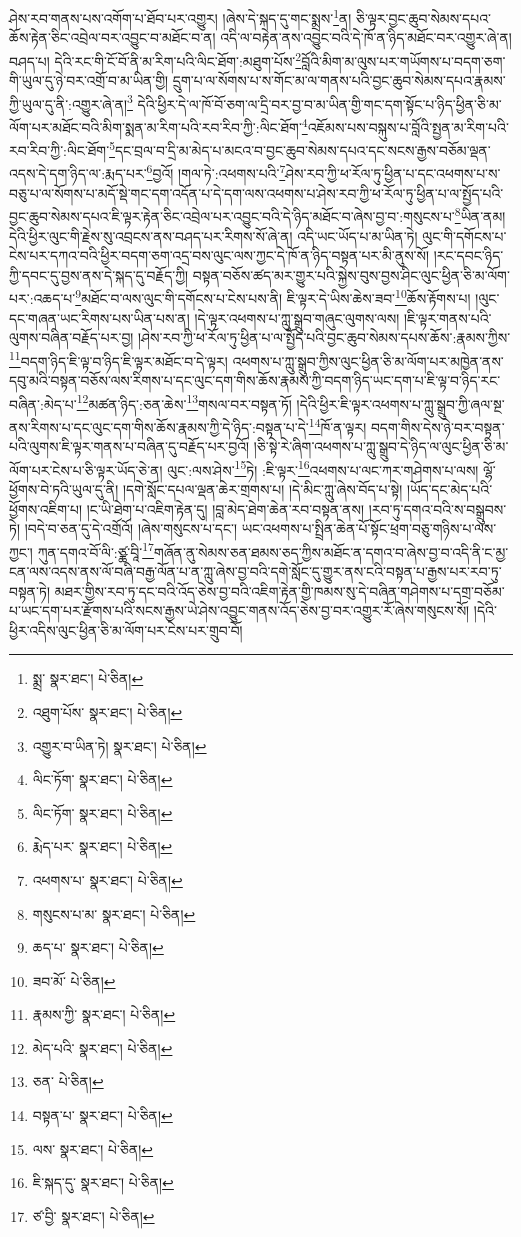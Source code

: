 ཤེས་རབ་གནས་པས་འགོག་པ་ཐོབ་པར་འགྱུར། །ཞེས་དེ་སྐད་དུ་གང་སྨྲས་\footnote{སྨྲ་  སྣར་ཐང་།  པེ་ཅིན། }ན། ཅི་ལྟར་བྱང་ཆུབ་སེམས་དཔའ་ཆོས་རྟེན་ཅིང་འབྲེལ་བར་འབྱུང་བ་མཐོང་བ་ན། འདི་ལ་བརྟེན་ནས་འབྱུང་བའི་དེ་ཁོ་ན་ཉིད་མཐོང་བར་འགྱུར་ཞེ་ན། བཤད་པ། དེའི་རང་གི་ངོ་བོ་ནི་མ་རིག་པའི་ལིང་ཐོག་:མཐུག་པོས་\footnote{འཐུག་པོས་  སྣར་ཐང་།  པེ་ཅིན། }བློའི་མིག་མ་ལུས་པར་གཡོགས་པ་བདག་ཅག་གི་ཡུལ་དུ་ཉེ་བར་འགྲོ་བ་མ་ཡིན་གྱི། དྲུག་པ་ལ་སོགས་པ་ས་གོང་མ་ལ་གནས་པའི་བྱང་ཆུབ་སེམས་དཔའ་རྣམས་ཀྱི་ཡུལ་དུ་ནི་:འགྱུར་ཞེ་ན།\footnote{འགྱུར་བ་ཡིན་ཏེ།  སྣར་ཐང་།  པེ་ཅིན། } དེའི་ཕྱིར་དེ་ལ་ཁོ་བོ་ཅག་ལ་དྲི་བར་བྱ་བ་མ་ཡིན་གྱི་གང་དག་སྟོང་པ་ཉིད་ཕྱིན་ཅི་མ་ལོག་པར་མཐོང་བའི་མིག་སྨན་མ་རིག་པའི་རབ་རིབ་ཀྱི་:ལིང་ཐོག་\footnote{ལིང་ཏོག་  སྣར་ཐང་།  པེ་ཅིན། }འཇོམས་པས་བསྐུས་པ་བློའི་སྤྱན་མ་རིག་པའི་རབ་རིབ་ཀྱི་:ལིང་ཐོག་\footnote{ལིང་ཏོག་  སྣར་ཐང་།  པེ་ཅིན། }དང་བྲལ་བ་དྲི་མ་མེད་པ་མངའ་བ་བྱང་ཆུབ་སེམས་དཔའ་དང་སངས་རྒྱས་བཅོམ་ལྡན་འདས་དེ་དག་ཉིད་ལ་:རྨད་པར་\footnote{རྨེད་པར་  སྣར་ཐང་།  པེ་ཅིན། }བྱའོ། །གལ་ཏེ་:འཕགས་པའི་\footnote{འཕགས་པ་  སྣར་ཐང་།  པེ་ཅིན། }ཤེས་རབ་ཀྱི་ཕ་རོལ་ཏུ་ཕྱིན་པ་དང་འཕགས་པ་ས་བཅུ་པ་ལ་སོགས་པ་མདོ་སྡེ་གང་དག་འདོན་པ་དེ་དག་ལས་འཕགས་པ་ཤེས་རབ་ཀྱི་ཕ་རོལ་ཏུ་ཕྱིན་པ་ལ་སྤྱོད་པའི་བྱང་ཆུབ་སེམས་དཔའ་ཇི་ལྟར་རྟེན་ཅིང་འབྲེལ་པར་འབྱུང་བའི་དེ་ཉིད་མཐོང་བ་ཞེས་བྱ་བ་:གསུངས་པ་\footnote{གསུངས་པ་མ་  སྣར་ཐང་།  པེ་ཅིན། }ཡིན་ནམ། དེའི་ཕྱིར་ལུང་གི་རྗེས་སུ་འབྲངས་ནས་བཤད་པར་རིགས་སོ་ཞེ་ན། འདི་ཡང་ཡོད་པ་མ་ཡིན་ཏེ། ལུང་གི་དགོངས་པ་ངེས་པར་དཀའ་བའི་ཕྱིར་བདག་ཅག་འདྲ་བས་ལུང་ལས་ཀྱང་དེ་ཁོ་ན་ཉིད་བསྟན་པར་མི་ནུས་སོ། །རང་དབང་ཉིད་ཀྱི་དབང་དུ་བྱས་ནས་དེ་སྐད་དུ་བརྗོད་ཀྱི། བསྟན་བཅོས་ཚད་མར་གྱུར་པའི་སྐྱེས་བུས་བྱས་ཤིང་ལུང་ཕྱིན་ཅི་མ་ལོག་པར་:འཆད་པ་\footnote{ཆད་པ་  སྣར་ཐང་།  པེ་ཅིན། }མཐོང་བ་ལས་ལུང་གི་དགོངས་པ་ངེས་པས་ནི། ཇི་ལྟར་དེ་ཡིས་ཆེས་ཟབ་\footnote{ཟབ་མོ་  པེ་ཅིན། }ཆོས་རྟོགས་པ། །ལུང་དང་གཞན་ཡང་རིགས་པས་ཡིན་པས་ན། །དེ་ལྟར་འཕགས་པ་ཀླུ་སྒྲུབ་གཞུང་ལུགས་ལས། །ཇི་ལྟར་གནས་པའི་ལུགས་བཞིན་བརྗོད་པར་བྱ། །ཤེས་རབ་ཀྱི་ཕ་རོལ་ཏུ་ཕྱིན་པ་ལ་སྤྱོད་པའི་བྱང་ཆུབ་སེམས་དཔས་ཆོས་:རྣམས་ཀྱིས་\footnote{རྣམས་ཀྱི་  སྣར་ཐང་།  པེ་ཅིན། }བདག་ཉིད་ཇི་ལྟ་བ་ཉིད་ཇི་ལྟར་མཐོང་བ་དེ་ལྟར། འཕགས་པ་ཀླུ་སྒྲུབ་ཀྱིས་ལུང་ཕྱིན་ཅི་མ་ལོག་པར་མཁྱེན་ནས་དབུ་མའི་བསྟན་བཅོས་ལས་རིགས་པ་དང་ལུང་དག་གིས་ཆོས་རྣམས་ཀྱི་བདག་ཉིད་ཡང་དག་པ་ཇི་ལྟ་བ་ཉིད་རང་བཞིན་:མེད་པ་\footnote{མེད་པའི་  སྣར་ཐང་།  པེ་ཅིན། }མཚན་ཉིད་:ཅན་ཆེས་\footnote{ཅན་  པེ་ཅིན། }གསལ་བར་བསྟན་ཏོ། །དེའི་ཕྱིར་ཇི་ལྟར་འཕགས་པ་ཀླུ་སྒྲུབ་ཀྱི་ཞལ་སྔ་ནས་རིགས་པ་དང་ལུང་དག་གིས་ཆོས་རྣམས་ཀྱི་དེ་ཉིད་:བསྟན་པ་དེ་\footnote{བསྟན་པ་  སྣར་ཐང་།  པེ་ཅིན། }ཁོ་ན་ལྟར། བདག་གིས་དེས་ཉེ་བར་བསྟན་པའི་ལུགས་ཇི་ལྟར་གནས་པ་བཞིན་དུ་བརྗོད་པར་བྱའོ། །ཅི་སྟེ་རེ་ཞིག་འཕགས་པ་ཀླུ་སྒྲུབ་དེ་ཉིད་ལ་ལུང་ཕྱིན་ཅི་མ་ལོག་པར་ངེས་པ་ཅི་ལྟར་ཡོད་ཅེ་ན། ལུང་:ལས་ཤེས་\footnote{ལས་  སྣར་ཐང་།  པེ་ཅིན། }ཏེ། :ཇི་ལྟར་\footnote{ཇི་སྐད་དུ་  སྣར་ཐང་།  པེ་ཅིན། }འཕགས་པ་ལང་ཀར་གཤེགས་པ་ལས། ལྷོ་ཕྱོགས་བེ་ཏའི་ཡུལ་དུ་ནི། །དགེ་སློང་དཔལ་ལྡན་ཆེར་གྲགས་པ། །དེ་མིང་ཀླུ་ཞེས་བོད་པ་སྟེ། །ཡོད་དང་མེད་པའི་ཕྱོགས་འཇིག་པ། །ང་ཡི་ཐེག་པ་འཇིག་རྟེན་དུ། །བླ་མེད་ཐེག་ཆེན་རབ་བསྟན་ནས། །རབ་ཏུ་དགའ་བའི་ས་བསྒྲུབས་ཏེ། །བདེ་བ་ཅན་དུ་དེ་འགྲོའོ། །ཞེས་གསུངས་པ་དང་། ཡང་འཕགས་པ་སྤྲིན་ཆེན་པོ་སྟོང་ཕྲག་བཅུ་གཉིས་པ་ལས་ཀྱང་། ཀུན་དགའ་བོ་ལི་:ཙྪ་བཱི་\footnote{ཙ་བྱི་  སྣར་ཐང་།  པེ་ཅིན། }གཞོན་ནུ་སེམས་ཅན་ཐམས་ཅད་ཀྱིས་མཐོང་ན་དགའ་བ་ཞེས་བྱ་བ་འདི་ནི་ང་མྱ་ངན་ལས་འདས་ནས་ལོ་བཞི་བརྒྱ་ལོན་པ་ན་ཀླུ་ཞེས་བྱ་བའི་དགེ་སློང་དུ་གྱུར་ནས་ངའི་བསྟན་པ་རྒྱས་པར་རབ་ཏུ་བསྟན་ཏེ། མཐར་གྱིས་རབ་ཏུ་དང་བའི་འོད་ཅེས་བྱ་བའི་འཇིག་རྟེན་གྱི་ཁམས་སུ་དེ་བཞིན་གཤེགས་པ་དགྲ་བཅོམ་པ་ཡང་དག་པར་རྫོགས་པའི་སངས་རྒྱས་ཡེ་ཤེས་འབྱུང་གནས་འོད་ཅེས་བྱ་བར་འགྱུར་རོ་ཞེས་གསུངས་སོ། །དེའི་ཕྱིར་འདིས་ལུང་ཕྱིན་ཅི་མ་ལོག་པར་ངེས་པར་གྲུབ་བོ། 